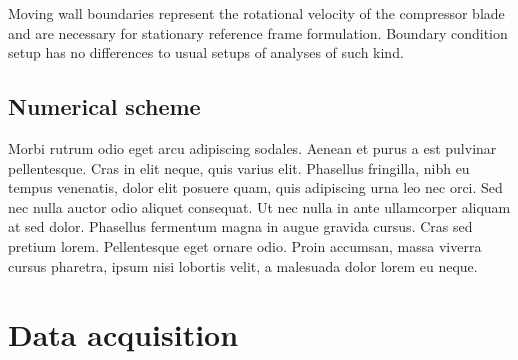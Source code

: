 Moving wall boundaries represent the rotational velocity of the compressor blade and are necessary for stationary reference frame formulation. Boundary condition setup has no differences to usual setups of analyses of such kind.

\subsection{Numerical scheme}
Morbi rutrum odio eget arcu adipiscing sodales. Aenean et purus a est pulvinar pellentesque. Cras in elit neque, quis varius elit. Phasellus fringilla, nibh eu tempus venenatis, dolor elit posuere quam, quis adipiscing urna leo nec orci. Sed nec nulla auctor odio aliquet consequat. Ut nec nulla in ante ullamcorper aliquam at sed dolor. Phasellus fermentum magna in augue gravida cursus. Cras sed pretium lorem. Pellentesque eget ornare odio. Proin accumsan, massa viverra cursus pharetra, ipsum nisi lobortis velit, a malesuada dolor lorem eu neque.

\section{Data acquisition} \label{casedata}